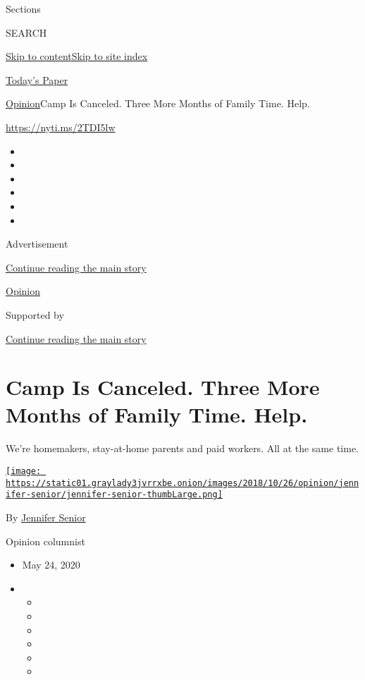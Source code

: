 Sections

SEARCH

\protect\hyperlink{site-content}{Skip to
content}\protect\hyperlink{site-index}{Skip to site index}

\href{https://myaccount.nytimes3xbfgragh.onion/auth/login?response_type=cookie\&client_id=vi}{}

\href{https://www.nytimes3xbfgragh.onion/section/todayspaper}{Today's
Paper}

\href{/section/opinion}{Opinion}\textbar{}Camp Is Canceled. Three More
Months of Family Time. Help.

\url{https://nyti.ms/2TDI5lw}

\begin{itemize}
\item
\item
\item
\item
\item
\item
\end{itemize}

Advertisement

\protect\hyperlink{after-top}{Continue reading the main story}

\href{/section/opinion}{Opinion}

Supported by

\protect\hyperlink{after-sponsor}{Continue reading the main story}

\hypertarget{camp-is-canceled-three-more-months-of-family-time-help}{%
\section{Camp Is Canceled. Three More Months of Family Time.
Help.}\label{camp-is-canceled-three-more-months-of-family-time-help}}

We're homemakers, stay-at-home parents and paid workers. All at the same
time.

\href{https://www.nytimes3xbfgragh.onion/by/jennifer-senior}{\texttt{[image: https://static01.graylady3jvrrxbe.onion/images/2018/10/26/opinion/jennifer-senior/jennifer-senior-thumbLarge.png]}}

By \href{https://www.nytimes3xbfgragh.onion/by/jennifer-senior}{Jennifer
Senior}

Opinion columnist

\begin{itemize}
\item
  May 24, 2020
\item
  \begin{itemize}
  \item
  \item
  \item
  \item
  \item
  \item
  \end{itemize}
\end{itemize}

